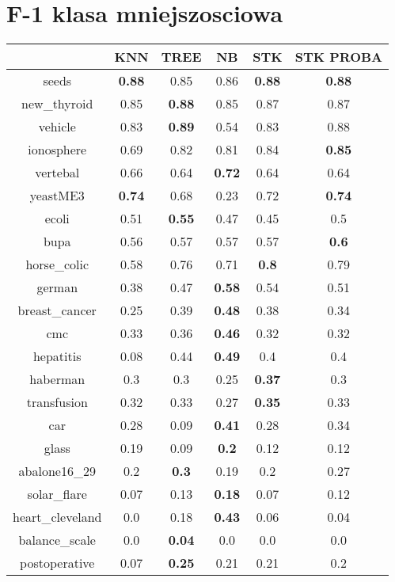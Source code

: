 \documentclass{article}%
\begin{document}
\section*{F{-}1 klasa mniejszosciowa}%
\begin{tabular}{c|ccccc}%
&KNN&TREE&NB&STK&STK PROBA\\%
\hline%
seeds&\textbf{0.88}&0.85&0.86&\textbf{0.88}&\textbf{0.88}\\%
new\_thyroid&0.85&\textbf{0.88}&0.85&0.87&0.87\\%
vehicle&0.83&\textbf{0.89}&0.54&0.83&0.88\\%
ionosphere&0.69&0.82&0.81&0.84&\textbf{0.85}\\%
vertebal&0.66&0.64&\textbf{0.72}&0.64&0.64\\%
yeastME3&\textbf{0.74}&0.68&0.23&0.72&\textbf{0.74}\\%
ecoli&0.51&\textbf{0.55}&0.47&0.45&0.5\\%
bupa&0.56&0.57&0.57&0.57&\textbf{0.6}\\%
horse\_colic&0.58&0.76&0.71&\textbf{0.8}&0.79\\%
german&0.38&0.47&\textbf{0.58}&0.54&0.51\\%
breast\_cancer&0.25&0.39&\textbf{0.48}&0.38&0.34\\%
cmc&0.33&0.36&\textbf{0.46}&0.32&0.32\\%
hepatitis&0.08&0.44&\textbf{0.49}&0.4&0.4\\%
haberman&0.3&0.3&0.25&\textbf{0.37}&0.3\\%
transfusion&0.32&0.33&0.27&\textbf{0.35}&0.33\\%
car&0.28&0.09&\textbf{0.41}&0.28&0.34\\%
glass&0.19&0.09&\textbf{0.2}&0.12&0.12\\%
abalone16\_29&0.2&\textbf{0.3}&0.19&0.2&0.27\\%
solar\_flare&0.07&0.13&\textbf{0.18}&0.07&0.12\\%
heart\_cleveland&0.0&0.18&\textbf{0.43}&0.06&0.04\\%
balance\_scale&0.0&\textbf{0.04}&0.0&0.0&0.0\\%
postoperative&0.07&\textbf{0.25}&0.21&0.21&0.2\\%
\end{tabular}

%
\end{document}
